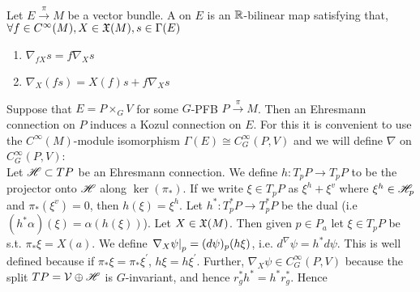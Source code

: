 \documentclass{article}
\begin{document}
\begin{definition}
	Let $E \overset{\pi}{\to} M$ be a vector bundle. A  on $E$ is an $\mathbb{R}$-bilinear map
	satisfying that, $\forall f \in C^\infty(M), X \in \mathfrak{X}(M), s \in \Gamma(E)$
	\begin{enumerate}
		\item $\nabla_{fX}s = f \nabla_X s $
		\item $\nabla_X(fs) = X(f) s + f \nabla_X s $
	\end{enumerate}
\end{definition}

Suppose that $E = P \times_G V$ for some $G$-PFB $P \overset{\pi}{\to}M$. Then an Ehresmann connection on $P$ induces a Kozul connection on $E$. For this it is convenient to use the $C^\infty(M)$-module isomorphism $\Gamma(E) \cong C_G^\infty(P,V)$ and we will define $\nabla$ on $C_G^\infty(P,V)$:\\
Let $\mathscr{H} \subset TP$ be an Ehresmann connection. We define $h: T_pP \to T_p P $ to be the projector onto $\mathscr{H}$ along $\ker(\pi_\ast)$. If we write $\xi \in T_pP$ as $\xi^h + \xi^v$ where $\xi^h \in \mathscr{H}_p$ and $\pi_\ast(\xi^v) = 0$, then $h(\xi) = \xi^h$. Let $h^\ast : T_p^\ast P \to T_p^\ast P$ be the dual (i.e $(h^\ast \alpha)(\xi) = \alpha(h(\xi))$). Let $X \in \mathfrak{X}(M)$. Then given $p \in P_a$ let $\xi \in T_pP$ be s.t. $\pi_\ast \xi = X(a)$. We define $\left. \nabla_X \psi \right\rvert_{p} = (d\psi)_p(h\xi)$, i.e. $d^\nabla \psi = h^\ast d\psi$. This is well defined because if $\pi_\ast \xi = \pi_\ast \xi^\prime$, $h\xi = h\xi^\prime$. Further, $\nabla_X \psi \in C^\infty_G(P,V)$ because the split $TP = \mathcal{V} \oplus \mathscr{H}$ is $G$-invariant, and hence $r_g^\ast h^\ast= h^\ast r_g^\ast $. Hence 
\end{document}
